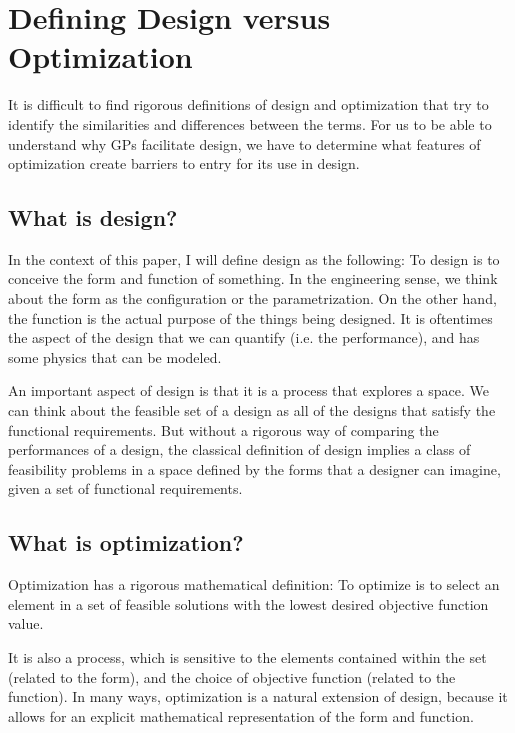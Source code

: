 \section{Defining Design versus Optimization} \label{s:DesVsOpt}

It is difficult to find rigorous definitions of design and optimization that
try to identify the similarities and differences between the terms. For us to be
able to understand why \gls{GP}s facilitate design, we have to determine what 
features of optimization create barriers to entry for its use in design. 

\subsection{What is design?}

In the context of this paper, I will define design as the following:
To design is to conceive the form and function of something.
In the engineering sense, we think about the form as the configuration or
the parametrization. On the other hand, the function is the actual purpose of the things
being designed. It is oftentimes the aspect of the design that we can
quantify (i.e. the performance), and has some physics that can be modeled.

An important aspect of design is that it is a process that explores a space.
We can think about the feasible set of a design as all of the designs
that satisfy the functional requirements. But without a rigorous way of comparing
the performances of a design, the classical
definition of design implies a class of feasibility problems in a space defined by
the forms that a designer can imagine, given a set
of functional requirements. 

\subsection{What is optimization?}

Optimization has a rigorous mathematical definition: To optimize is to select an 
element in a set of feasible solutions with the lowest desired objective
function value. 

It is also a process, which is sensitive to the elements contained within the set
(related to the form), and the choice of objective function (related to the 
function). In many ways, optimization is a natural extension of design, because it allows
for an explicit mathematical representation of the form and function.

